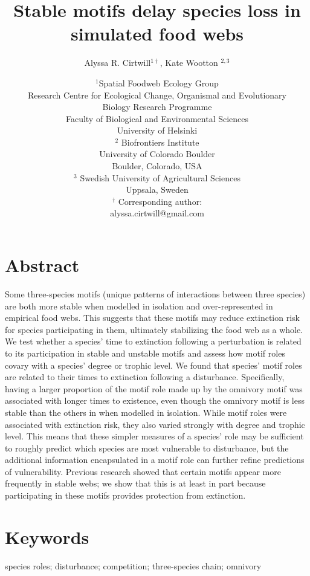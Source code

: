 \documentclass[12pt]{article}
\title{Stable motifs delay species loss in simulated food webs}
\author{Alyssa R. Cirtwill$^{1\dagger}$, Kate Wootton $^{2,3}$}
\date{\small$^1$Spatial Foodweb Ecology Group\\
Research Centre for Ecological Change, Organismal and Evolutionary\\
Biology Research Programme\\
Faculty of Biological and Environmental
Sciences\\
University of Helsinki\\
\medskip
\small$^2$ Biofrontiers Institute\\
University of Colorado Boulder\\
Boulder, Colorado, USA\\
\medskip
\small$^3$ Swedish University of Agricultural Sciences\\
Uppsala, Sweden\\
\medskip
$^\dagger$ Corresponding author:\\
alyssa.cirtwill@gmail.com\\
 }
\begin{document}
 
\maketitle 
\raggedright
\setlength{\parindent}{15pt} 

\clearpage
\linenumbers
\begin{spacing}{2.0}

\section*{Abstract} %
    Some three-species motifs (unique patterns of interactions between three species) are both more stable when modelled in isolation and over-represented in empirical food webs. This suggests that these motifs may reduce extinction risk for species participating in them, ultimately stabilizing the food web as a whole. 
    We test whether a species' time to extinction following a perturbation is related to its participation in stable and unstable motifs and assess how motif roles covary with a species' degree or trophic level.
    We found that species' motif roles are related to their times to extinction following a disturbance. Specifically, having a larger proportion of the motif role made up by the omnivory motif was associated with longer times to existence, even though the omnivory motif is less stable than the others in when modelled in isolation.
    While motif roles were associated with extinction risk, they also varied strongly with degree and trophic level. This means that these simpler measures of a species' role may be sufficient to roughly predict which species are most vulnerable to disturbance, but the additional information encapsulated in a motif role can further refine predictions of vulnerability. Previous research showed that certain motifs appear more frequently in stable webs; we show that this is at least in part because participating in these motifs provides protection from extinction.%

\section*{Keywords}

	species roles; disturbance; competition; three-species chain; omnivory


\end{spacing}
\end{document}
